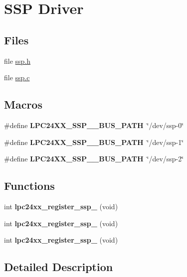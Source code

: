 \hypertarget{group__RTEMSBSPsARMLPC24XXSSP}{}\section{S\+SP Driver}
\label{group__RTEMSBSPsARMLPC24XXSSP}
\subsection*{Files}
\begin{DoxyCompactItemize}
\item 
file \mbox{\hyperlink{ssp_8h}{ssp.\+h}}
\item 
file \mbox{\hyperlink{ssp_8c}{ssp.\+c}}
\end{DoxyCompactItemize}
\subsection*{Macros}
\begin{DoxyCompactItemize}
\item 
\mbox{\label{group__RTEMSBSPsARMLPC24XXSSP_ga547e6893c0eac63f992f21b77b86ce92}} 
\#define {\bfseries L\+P\+C24\+X\+X\+\_\+\+S\+S\+P\+\_\+\_\+\+B\+U\+S\+\_\+\+P\+A\+TH}~\char`\"{}/dev/ssp-\/0\char`\"{}
\item 
\mbox{\label{group__RTEMSBSPsARMLPC24XXSSP_gaf07c0a85ff0c9c550c15484d0853a9e6}} 
\#define {\bfseries L\+P\+C24\+X\+X\+\_\+\+S\+S\+P\+\_\+\_\+\+B\+U\+S\+\_\+\+P\+A\+TH}~\char`\"{}/dev/ssp-\/1\char`\"{}
\item 
\mbox{\label{group__RTEMSBSPsARMLPC24XXSSP_ga6aced82f0f9a5e7745be83be338bcf1c}} 
\#define {\bfseries L\+P\+C24\+X\+X\+\_\+\+S\+S\+P\+\_\+\_\+\+B\+U\+S\+\_\+\+P\+A\+TH}~\char`\"{}/dev/ssp-\/2\char`\"{}
\end{DoxyCompactItemize}
\subsection*{Functions}
\begin{DoxyCompactItemize}
\item 
\mbox{\label{group__RTEMSBSPsARMLPC24XXSSP_gae05a0d55f9b8e21128c301564bec77c5}} 
int {\bfseries lpc24xx\+\_\+register\+\_\+ssp\+\_} (void)
\item 
\mbox{\label{group__RTEMSBSPsARMLPC24XXSSP_ga895500225842fcfffe004c803f074dee}} 
int {\bfseries lpc24xx\+\_\+register\+\_\+ssp\+\_} (void)
\item 
\mbox{\label{group__RTEMSBSPsARMLPC24XXSSP_gaecc39b820f33e059bd035027cffb8595}} 
int {\bfseries lpc24xx\+\_\+register\+\_\+ssp\+\_} (void)
\end{DoxyCompactItemize}


\subsection{Detailed Description}
